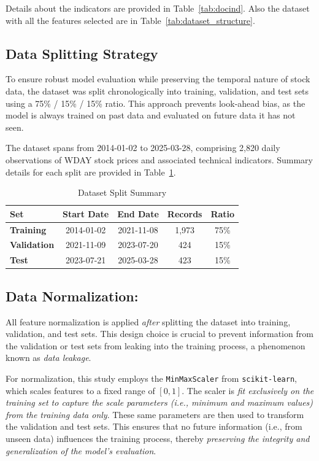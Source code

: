 Details about the indicators are provided in Table~\ref{tab:docind}. Also the dataset with all the features
selected are in Table~\ref{tab:dataset_structure}.

\subsection{Data Splitting Strategy}

To ensure robust model evaluation while preserving the temporal nature of stock data, the
dataset was split chronologically into training, validation, and test sets using a 
75\% / 15\% / 15\% ratio. This approach prevents look-ahead bias, as the model is always
trained on past data and evaluated on future data it has not seen.

The dataset spans from 2014-01-02 to 2025-03-28, comprising 2,820 daily observations of
WDAY stock prices and associated technical indicators. Summary details for each split are provided in Table~\ref{tab:data-split-summary}.

\begin{table}[H]
\centering
\caption{Dataset Split Summary}
\label{tab:data-split-summary}
\begin{tabular}{lcccc}
\hline
\textbf{Set} & \textbf{Start Date} & \textbf{End Date} & \textbf{Records} & \textbf{Ratio} \\
\hline\hline
\textbf{Training}     & 2014-01-02 & 2021-11-08 & 1,973 & 75\% \\
\textbf{Validation}   & 2021-11-09 & 2023-07-20 & 424   & 15\% \\
\textbf{Test}         & 2023-07-21 & 2025-03-28 & 423   & 15\% \\
\hline
\end{tabular}
\end{table}

\subsection{Data Normalization:}
All feature normalization is applied \emph{after} splitting the dataset into 
training, validation, and test sets. This design choice is crucial to prevent 
information from the validation or test sets from leaking into the training 
process, a phenomenon known as \emph{data leakage}.

For normalization, this study employs the \texttt{MinMaxScaler} from 
\texttt{scikit-learn}, which scales features to a fixed range of $[0, 1]$. The 
scaler is \emph{fit exclusively on the training set to capture the scale parameters 
(i.e., minimum and maximum values) from the training data only}. These same 
parameters are then used to transform the validation and test sets. This ensures 
that no future information (i.e., from unseen data) influences the training 
process, thereby \emph{preserving the integrity and generalization of the 
model's evaluation}.

